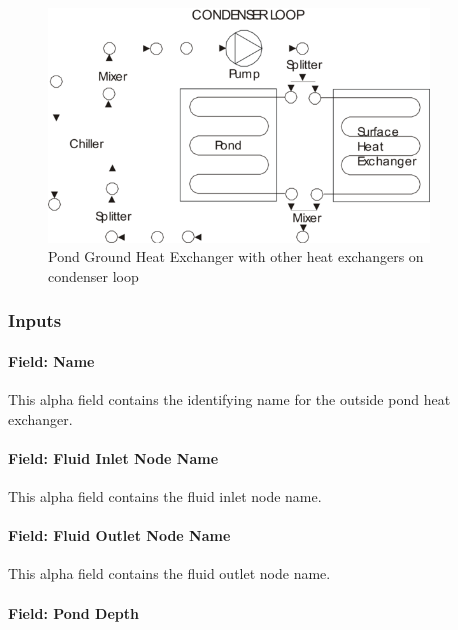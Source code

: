\begin{figure}[hbtp] %
\centering
\includegraphics[width=0.9\textwidth, height=0.9\textheight, keepaspectratio=true]{media/image204.png}
\caption{Pond Ground Heat Exchanger with other heat exchangers on condenser loop \protect \label{fig:pond-ground-heat-exchanger-with-other-heat}}
\end{figure}

\subsubsection{Inputs}\label{inputs-12-002}

\paragraph{Field: Name}\label{field-name-11-002}

This alpha field contains the identifying name for the outside pond heat exchanger.

\paragraph{Field: Fluid Inlet Node Name}\label{field-fluid-inlet-node-name}

This alpha field contains the fluid inlet node name.

\paragraph{Field: Fluid Outlet Node Name}\label{field-fluid-outlet-node-name}

This alpha field contains the fluid outlet node name.

\paragraph{Field: Pond Depth}\label{field-pond-depth}

